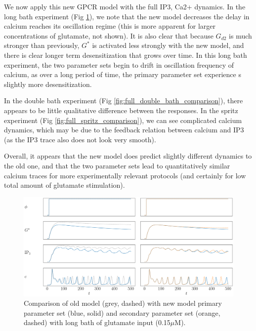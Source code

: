 \documentclass[12pt]{article}
\begin{document}
We now apply this new GPCR model with the full IP3, Ca2+ dynamics. In the long bath experiment (Fig \ref{fig:full_pulse_comparison}), we note that the new model decreases the delay in calcium reaches its oscillation regime (this is more apparent for larger concentrations of glutamate, not shown). It is also clear that because $G_{d2}$ is much stronger than previously, $G^*$ is activated less strongly with the new model, and there is clear longer term desensitization that grows over time. In this long bath experiment, the two parameter sets begin to drift in oscillation frequency of calcium, as over a long period of time, the primary parameter set experience s slightly more desensitization.

In the double bath experiment (Fig \ref{fig:full_double_bath_comparison}), there appears to be little qualitative difference between the responses. In the spritz experiment (Fig \ref{fig:full_spritz_comparison}), we can see complicated calcium dynamics, which may be due to the feedback relation between calcium and IP3 (as the IP3 trace also does not look very smooth). 

Overall, it appears that the new model does predict slightly different dynamics to the old one, and that the two parameter sets lead to quantitatively similar calcium traces for more experimentally relevant protocols (and certainly for low total amount of glutamate stimulation).

\begin{figure}[H]
	\includegraphics[width=1\linewidth]{figures/full_pulse_comparison.png}
	\centering
	\caption{Comparison of old model (grey, dashed) with new model primary parameter set (blue, solid) and secondary parameter set (orange, dashed) with long bath of glutamate input (0.15$\mu$M).}
	\label{fig:full_pulse_comparison}
\end{figure}
\end{document}
